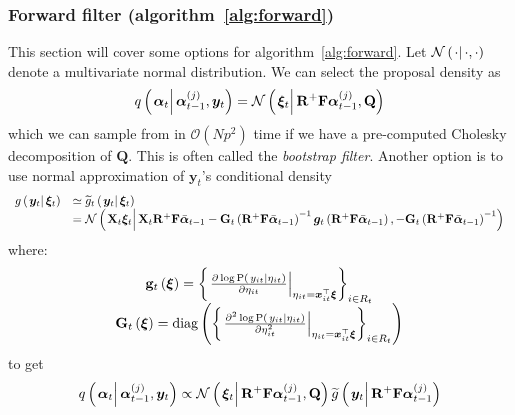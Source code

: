 \documentclass[9pt, notitlepage]{article}
\renewcommand{\vec}[1]{\bm{#1}}
\newcommand{\vecb}[1]{\bar{\vec{#1}}}
\newcommand{\mat}[1]{\mathbf{#1}}
\newcommand{\Lbrace}[1]{\left\{ #1\right\}}
\newcommand{\Lparen}[1]{\left( #1\right)}
\newcommand{\Cond}[2]{\left. #1 \vphantom{#2} \right\vert  #2}
\newcommand{\Prob}{\text{P}}
\newcommand{\optor}[2]{#1\Lparen{#2}}
\newcommand{\optorC}[3]{\optor{#1}{\Cond{#2}{#3}}}
\newcommand{\propC}[2]{\optorC{\Prob}{#1}{#2}}
\newcommand{\normalC}[3]{\optorC{\mathcal{N}}{#1}{#2,#3}}
\newcommand{\IDC}[2]{\optorC{q}{#1}{#2}}
\newcommand{\diag}[1]{\optor{\text{diag}}{#1}}
\newcommand{\partic}[3]{#1_{#2}^{\Lparen{#3}}}
\newcommand{\bigO}[1]{\mathcal{O}\Lparen{#1}}
\newcommand{\dimState}{p}
\newcommand{\nPart}{N}
\begin{document}
\subsubsection*{Forward filter (algorithm~\ref{alg:forward})}
This section will cover some options for algorithm~\ref{alg:forward}. Let $\normalC{\cdot}{\cdot}{\cdot}$ denote a multivariate normal distribution. We can select the proposal density as%
%
\begin{equation}
	\IDC{\vec{\alpha}_t}{\partic{\vec{\alpha}}{t-1}{j}, \vec{y}_t} = %
		\normalC{\vec{\xi}_t}{\mat{R}^{+}\mat{F}\partic{\vec{\alpha}}{t-1}{j}}{\mat{Q}}
\end{equation}%
%
which we can sample from in $\bigO{\nPart \dimState^2}$ time if we have a pre-computed Cholesky decomposition of $\mat{Q}$. This is often called the \emph{bootstrap filter}. Another option is to use normal approximation of $\vec{y}_t$'s conditional density%
%
\begin{equation}\begin{array}{cl}
	\optorC{g}{\vec{y}_t}{\vec{\xi}_t} & \simeq  \optorC{\widetilde{g}_t}{\vec{y}_t}{\vec{\xi}_t} \\ &= %
		\normalC{
			\mat{X}_t\vec{\xi}_t
		}{ %
			\mat{X}_t\mat{R}^{+}\mat{F}\vecb{\alpha}_{t - 1} -
			\mat{G}_t\Lparen{\mat{R}^{+}\mat{F}\vecb{\alpha}_{t - 1}}^{-1}
			\vec{g}_t\Lparen{\mat{R}^{+}\mat{F}\vecb{\alpha}_{t - 1}}
		}{ %
			- \mat{G}_t\Lparen{\mat{R}^{+}\mat{F}\vecb{\alpha}_{t - 1}}^{-1}
		}
\end{array}\end{equation}
%
%
where:
\begin{equation}\begin{array}{c}
\mat{g}_t\Lparen{\vec{\xi}} =
		\Lbrace{\left.\frac{
		\partial \log \propC{y_{it}}{\eta_{it}}
	}{
		\partial\eta_{it}
	}\right|_{\eta_{it} = \vec{x}_{it}^\top\vec{\xi}} }_{i \in R_t} \\
%
	\mat{G}_t\Lparen{\vec{\xi}} =
		\diag{\Lbrace{\left.\frac{
		\partial^2 \log \propC{y_{it}}{\eta_{it}}
	}{
		\partial\eta_{it}^2
	}\right|_{\eta_{it} = \vec{x}_{it}^\top\vec{\xi}} }_{i \in R_t}}
\end{array}\end{equation}
%
%
to get%
%
\begin{equation}
	\IDC{\vec{\alpha}_t}{\partic{\vec{\alpha}}{t-1}{j}, \vec{y}_t} \propto %
		\normalC{\vec{\xi}_t}{\mat{R}^{+}\mat{F}\partic{\vec{\alpha}}{t-1}{j}}{\mat{Q}}
		\optorC{\widetilde{g}}{\vec{y}_t}{\mat{R}^{+}\mat{F}\partic{\vec{\alpha}}{t-1}{j}}
\end{equation}
\end{document}
